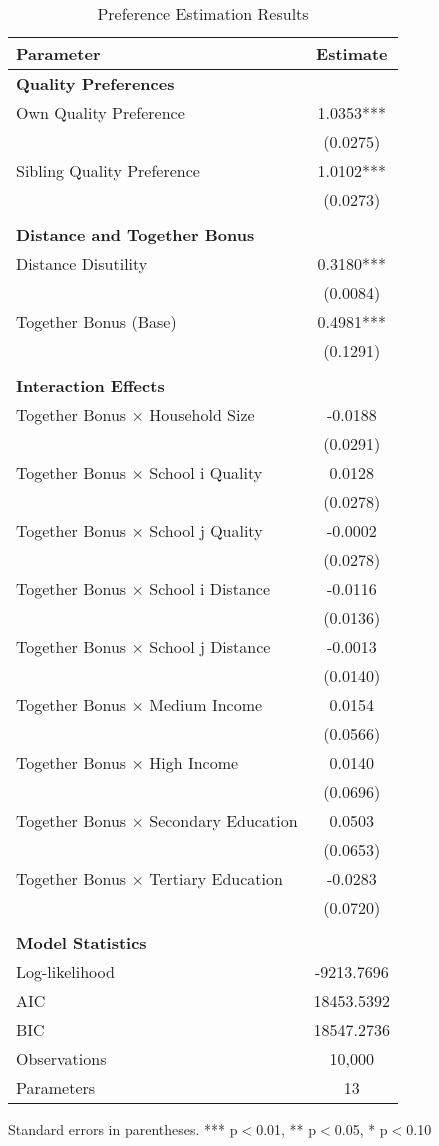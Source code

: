 \begin{table}[htbp]
\centering
\caption{Preference Estimation Results}
\label{tab:preference_estimates}
\begin{tabular}{lc}
\toprule
Parameter & Estimate \\
\midrule
\multicolumn{2}{l}{\textbf{Quality Preferences}} \\
\quad Own Quality Preference & 1.0353*** \\
& (0.0275) \\
\quad Sibling Quality Preference & 1.0102*** \\
& (0.0273) \\
\\
\multicolumn{2}{l}{\textbf{Distance and Together Bonus}} \\
\quad Distance Disutility & 0.3180*** \\
& (0.0084) \\
\quad Together Bonus (Base) & 0.4981*** \\
& (0.1291) \\
\\
\multicolumn{2}{l}{\textbf{Interaction Effects}} \\
\quad Together Bonus × Household Size & -0.0188 \\
& (0.0291) \\
\quad Together Bonus × School i Quality & 0.0128 \\
& (0.0278) \\
\quad Together Bonus × School j Quality & -0.0002 \\
& (0.0278) \\
\quad Together Bonus × School i Distance & -0.0116 \\
& (0.0136) \\
\quad Together Bonus × School j Distance & -0.0013 \\
& (0.0140) \\
\quad Together Bonus × Medium Income & 0.0154 \\
& (0.0566) \\
\quad Together Bonus × High Income & 0.0140 \\
& (0.0696) \\
\quad Together Bonus × Secondary Education & 0.0503 \\
& (0.0653) \\
\quad Together Bonus × Tertiary Education & -0.0283 \\
& (0.0720) \\
\\
\midrule
\multicolumn{2}{l}{\textbf{Model Statistics}} \\
Log-likelihood & -9213.7696 \\
AIC & 18453.5392 \\
BIC & 18547.2736 \\
Observations & 10,000 \\
Parameters & 13 \\
\bottomrule
\end{tabular}
\begin{flushleft}
\footnotesize
Standard errors in parentheses. 
*** p$<$0.01, ** p$<$0.05, * p$<$0.10
\end{flushleft}
\end{table}